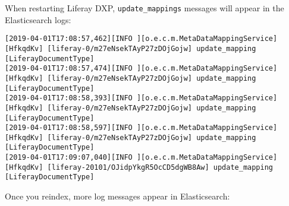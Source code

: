 When restarting Liferay DXP, \texttt{update\_mappings} messages will
appear in the Elasticsearch logs:

\begin{verbatim}
[2019-04-01T17:08:57,462][INFO ][o.e.c.m.MetaDataMappingService] [HfkqdKv] [liferay-0/m27eNsekTAyP27zDOjGojw] update_mapping [LiferayDocumentType]
[2019-04-01T17:08:57,474][INFO ][o.e.c.m.MetaDataMappingService] [HfkqdKv] [liferay-0/m27eNsekTAyP27zDOjGojw] update_mapping [LiferayDocumentType]
[2019-04-01T17:08:58,393][INFO ][o.e.c.m.MetaDataMappingService] [HfkqdKv] [liferay-0/m27eNsekTAyP27zDOjGojw] update_mapping [LiferayDocumentType]
[2019-04-01T17:08:58,597][INFO ][o.e.c.m.MetaDataMappingService] [HfkqdKv] [liferay-0/m27eNsekTAyP27zDOjGojw] update_mapping [LiferayDocumentType]
[2019-04-01T17:09:07,040][INFO ][o.e.c.m.MetaDataMappingService] [HfkqdKv] [liferay-20101/OJidpYkgR5OcCD5dgWB8Aw] update_mapping [LiferayDocumentType]
\end{verbatim}

Once you reindex, more log messages appear in Elasticsearch:

